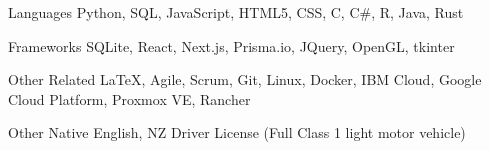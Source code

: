 

\begin{cvskills}

  \cvskill
    {Languages} %
    {Python, SQL, JavaScript, HTML5, CSS, C, C\#, R, Java, Rust} %

  \cvskill
    {Frameworks} %
    {SQLite, React, Next.js, Prisma.io, JQuery, OpenGL, tkinter} %

  \cvskill
    {Other Related} %
    {LaTeX, Agile, Scrum, Git, Linux, Docker, IBM Cloud, Google Cloud Platform, Proxmox VE, Rancher} %

  \cvskill
    {Other} %
    {Native English, NZ Driver License (Full Class 1 light motor vehicle)} %


\end{cvskills}

